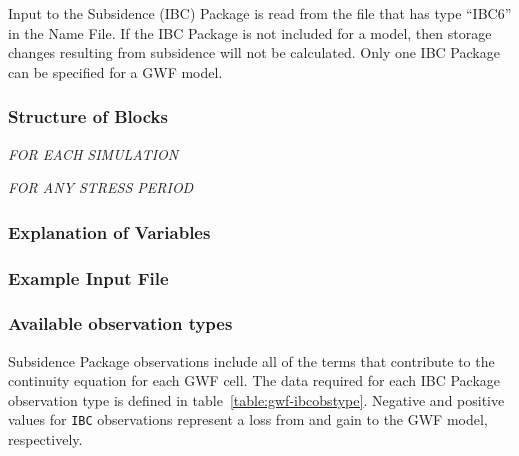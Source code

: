 Input to the Subsidence (IBC) Package is read from the file that has type ``IBC6'' in the Name File.  If the IBC Package is not included for a model, then storage changes resulting from subsidence will not be calculated.  Only one IBC Package can be specified for a GWF model.

\vspace{5mm}
\subsubsection{Structure of Blocks}

\vspace{5mm}
\noindent \textit{FOR EACH SIMULATION}




\vspace{5mm}
\noindent \textit{FOR ANY STRESS PERIOD}

\packageperioddescription

\vspace{5mm}
\subsubsection{Explanation of Variables}
\begin{description}

\end{description}

\vspace{5mm}
\subsubsection{Example Input File}



\vspace{5mm}
\subsubsection{Available observation types}
Subsidence Package observations include all of the terms that contribute to the continuity equation for each GWF cell. The data required for each IBC Package observation type is defined in table~\ref{table:gwf-ibcobstype}. Negative and positive values for \texttt{IBC} observations represent a loss from and gain to the GWF model, respectively.


